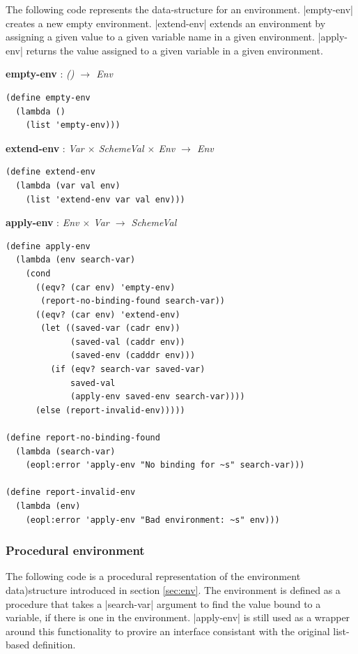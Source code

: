 \documentclass[a4paper]{article}
\begin{document}
The following code represents the data-structure for an environment. |empty-env| creates a new empty environment. |extend-env| extends an environment by assigning a given value to a given variable name in a given environment. |apply-env| returns the value assigned to a given variable in a given environment.

\textbf{empty-env} : \textit{() $\rightarrow$ Env}
\begin{lstlisting}[aboveskip=0pt]
(define empty-env
  (lambda ()
    (list 'empty-env)))
\end{lstlisting}

\textbf{extend-env} : \textit{Var $\times$ SchemeVal $\times$ Env $\rightarrow$ Env}
\begin{lstlisting}[aboveskip=0pt]
(define extend-env
  (lambda (var val env)
    (list 'extend-env var val env)))
\end{lstlisting}

\textbf{apply-env} : \textit{Env $\times$ Var $\rightarrow$ SchemeVal}
\begin{lstlisting}[aboveskip=0pt]
(define apply-env
  (lambda (env search-var)
    (cond
      ((eqv? (car env) 'empty-env)
       (report-no-binding-found search-var))
      ((eqv? (car env) 'extend-env)
       (let ((saved-var (cadr env))
             (saved-val (caddr env))
             (saved-env (cadddr env)))
         (if (eqv? search-var saved-var)
             saved-val
             (apply-env saved-env search-var))))
      (else (report-invalid-env)))))

(define report-no-binding-found
  (lambda (search-var)
    (eopl:error 'apply-env "No binding for ~s" search-var)))

(define report-invalid-env
  (lambda (env)
    (eopl:error 'apply-env "Bad environment: ~s" env)))
\end{lstlisting}

\subsubsection{Procedural environment}
\label{sec:proc_env}

The following code is a procedural representation of the environment data)structure introduced in section \ref{sec:env}. The environment is defined as a procedure that takes a |search-var| argument to find the value bound to a variable, if there is one in the environment. |apply-env| is still used as a wrapper around this functionality to provire an interface consistant with the original list-based definition.
\end{document}
